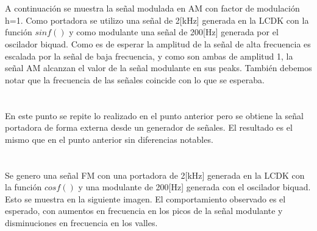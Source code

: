 \documentclass[11pt, letterpaper, titlepage]{article}
\begin{document}
\section{} A continuación se muestra la señal modulada en AM con factor de modulación h=1. Como portadora se utilizo una señal de 2[kHz] generada en la LCDK con la función $sinf()$ y como modulante una señal de 200[Hz] generada por el oscilador biquad.
Como es de esperar la amplitud de la señal de alta frecuencia es escalada por la señal de baja frecuencia, y como son ambas de amplitud 1, la señal AM alcanzan el valor de la señal modulante en sus peaks. También debemos notar que la frecuencia de las señales coincide con lo que se esperaba.
\section{}
En este punto se repite lo realizado en el punto anterior pero se obtiene la señal portadora de forma externa desde un generador de señales.
El resultado es el mismo que en el punto anterior sin diferencias notables.
\section{}
Se genero una señal FM con una portadora de 2[kHz] generada en la LCDK con la función $cosf()$ y una modulante de 200[Hz] generada con el oscilador biquad. Esto se muestra en la siguiente imagen.
El comportamiento observado es el esperado, con aumentos en frecuencia en los picos de la señal modulante y disminuciones en frecuencia en los valles.
\end{document}
